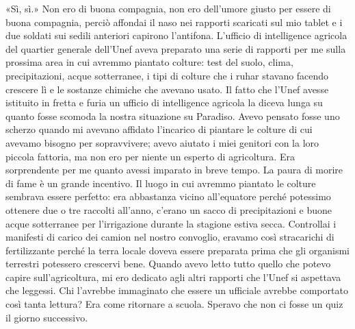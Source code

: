 «Sì, sì.» Non ero di buona compagnia, non ero dell'umore giusto per
essere di buona compagnia, perciò affondai il naso nei rapporti
scaricati sul mio tablet e i due soldati sui sedili anteriori capirono
l'antifona. L'ufficio di intelligence agricola del quartier generale
dell'Unef aveva preparato una serie di rapporti per me sulla prossima
area in cui avremmo piantato colture: test del suolo, clima,
precipitazioni, acque sotterranee, i tipi di colture che i ruhar stavano
facendo crescere lì e le sostanze chimiche che avevano usato. Il fatto
che l'Unef avesse istituito in fretta e furia un ufficio di intelligence
agricola la diceva lunga su quanto fosse scomoda la nostra situazione su
Paradiso. Avevo pensato fosse uno scherzo quando mi avevano affidato
l'incarico di piantare le colture di cui avevamo bisogno per
sopravvivere; avevo aiutato i miei genitori con la loro piccola
fattoria, ma non ero per niente un esperto di agricoltura. Era
sorprendente per me quanto avessi imparato in breve tempo. La paura di
morire di fame è un grande incentivo. Il luogo in cui avremmo piantato
le colture sembrava essere perfetto: era abbastanza vicino all'equatore
perché potessimo ottenere due o tre raccolti all'anno, c'erano un sacco
di precipitazioni e buone acque sotterranee per l'irrigazione durante la
stagione estiva secca. Controllai i manifesti di carico dei camion nel
nostro convoglio, eravamo così stracarichi di fertilizzante perché la
terra locale doveva essere preparata prima che gli organismi terrestri
potessero crescervi bene. Quando avevo letto tutto quello che potevo
capire sull'agricoltura, mi ero dedicato agli altri rapporti che l'Unef
si aspettava che leggessi. Chi l'avrebbe immaginato che essere un
ufficiale avrebbe comportato così tanta lettura? Era come ritornare a
scuola. Speravo che non ci fosse un quiz il giorno successivo.

